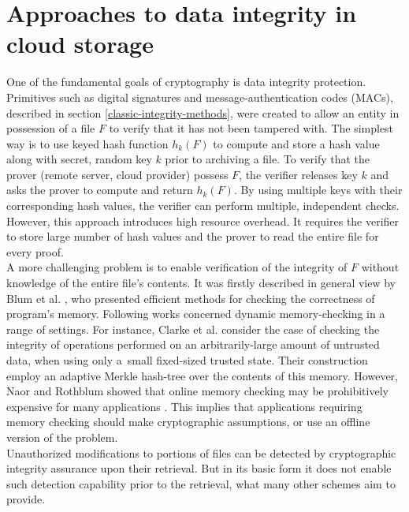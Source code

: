 	\section{Approaches to data integrity in cloud storage}
One of the fundamental goals of cryptography is data integrity protection.
Primitives such as digital signatures and message-authentication codes (MACs),
described in section \ref{classic-integrity-methods}, were created to allow
an entity in possession of a file $F$ to verify that it has not been tampered
with. The simplest way is to use keyed hash function $h_{k}(F)$ to compute and
store a hash value along with secret, random key $k$ prior to archiving a file.
To verify that the prover (remote server, cloud provider) possess $F$, the
verifier releases key $k$ and asks the prover to compute and return $h_{k}(F)$.
By using multiple keys with their corresponding hash values, the verifier can
perform multiple, independent checks. However, this approach introduces high
resource overhead. It requires the verifier to store large number
of hash values and the prover to read the entire file for every proof.\\

A more challenging problem is to enable verification of the integrity of $F$
without knowledge of the entire file's contents. It was firstly described in
general view by Blum et al. \cite{memory-correctness}, who presented efficient
methods for checking the correctness of program's memory. Following works
concerned dynamic memory-checking in a range of settings. For instance, Clarke
et al. \cite{clarke} consider the case of checking the integrity of operations
performed on an arbitrarily-large amount of untrusted data, when using only 
a~small fixed-sized trusted state. Their construction employ an adaptive
Merkle hash-tree over the contents of this memory. However, Naor and Rothblum
showed that online memory checking may be prohibitively expensive for many
applications \cite{omc-complexity}. This implies that applications requiring
memory checking should make cryptographic assumptions, or use an offline
version of the problem.\\

Unauthorized modifications to portions of files can be detected by
cryptographic integrity assurance upon their retrieval. But in its basic form
it does not enable such detection capability prior to the retrieval, what many
other schemes aim to provide.\\

